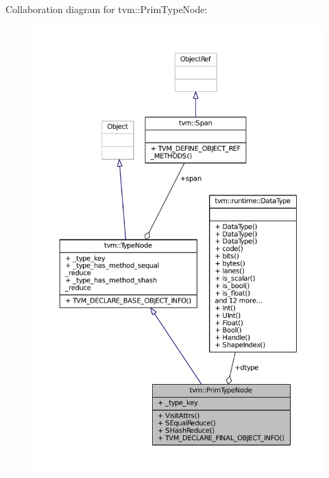 Collaboration diagram for tvm\+:\+:Prim\+Type\+Node\+:
\nopagebreak
\begin{figure}[H]
\begin{center}
\leavevmode
\includegraphics[width=350pt]{classtvm_1_1PrimTypeNode__coll__graph}
\end{center}
\end{figure}
